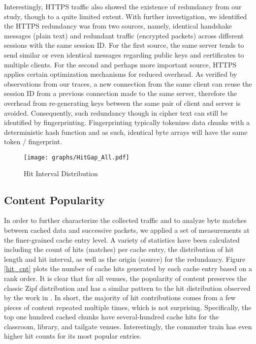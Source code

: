 \documentclass{sig-alternate}
\begin{document}
Interestingly, HTTPS traffic also showed the existence of redundancy from our study, though to a quite limited extent. With further investigation, we identified the HTTPS redundancy was from two sources, namely, identical handshake messages (plain text) and redundant traffic (encrypted packets) across different sessions with the same session ID. For the first source, the same server tends to send similar or even identical messages regarding public keys and certificates to multiple clients. For the second and perhaps more important source, HTTPS applies certain optimization mechanisms for reduced overhead. As verified by observations from our traces, a new connection from the same client can reuse the session ID from a previous connection made to the same server, therefore the overhead from re-generating keys between the same pair of client and server is avoided. Consequently, such redundancy though in cipher text can still be identified by fingerprinting. Fingerprinting typically tokenizes data chunks with a deterministic hash function and as such, identical byte arrays will have the same token / fingerprint.      

\begin{figure}[t!]
\centering
\texttt{[image: graphs/HitGap\_All.pdf]}
\caption{Hit Interval Distribution}
\label{hit_gap}
\end{figure}

\subsection{Content Popularity}

In order to further characterize the collected traffic and to analyze byte matches between cached data and successive packets, we applied a set of measurements at the finer-grained cache entry level. A variety of statistics have been calculated including the count of hits (matches) per cache entry, the distribution of hit length and hit interval, as well as the origin (source) for the redundancy. Figure \ref{hit_cnt} plots the number of cache hits generated by each cache entry based on a rank order. It is clear that for all venues, the popularity of content preserves the classic Zipf distribution and has a similar pattern to the hit distribution observed by the work in \cite{Anand:2009}. In short, the majority of hit contributions comes from a few pieces of content repeated multiple times, which is not surprising. Specifically, the top one hundred cached chunks have several-hundred cache hits for the classroom, library, and tailgate venues. Interestingly, the commuter train has even higher hit counts for its most popular entries.   
\end{document}
